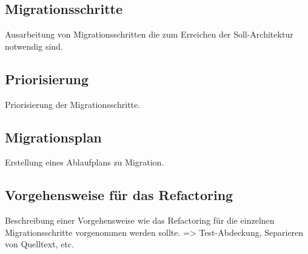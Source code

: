 \subsection{Migrationsschritte}
Ausarbeitung von Migrationsschritten die zum Erreichen der Soll-Architektur notwendig sind.

\subsection{Pri­o­ri­sie­rung}
Pri­o­ri­sie­rung der Migrationsschritte.

\subsection{Migrationsplan}
Erstellung eines Ablaufplans zu Migration.

\subsection{Vorgehensweise für das Refactoring}
Beschreibung einer Vorgehensweise wie das Refactoring für die einzelnen Migrationsschritte vorgenommen werden sollte.
=> Test-Abdeckung, Separieren von Quelltext, etc.
